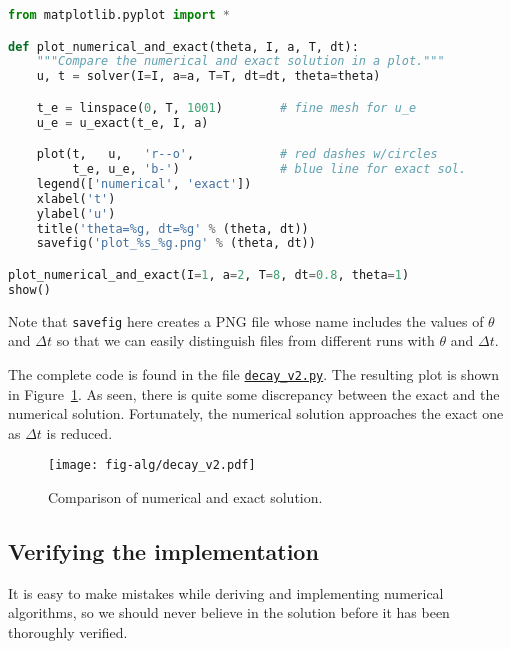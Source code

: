 \documentclass[graybox,sectrefs,envcountresetchap,open=right,final]{svmonodo}
\begin{document}
\begin{lstlisting}[language=python,style=blue1_bluegreen]
from matplotlib.pyplot import *

def plot_numerical_and_exact(theta, I, a, T, dt):
    """Compare the numerical and exact solution in a plot."""
    u, t = solver(I=I, a=a, T=T, dt=dt, theta=theta)

    t_e = linspace(0, T, 1001)        # fine mesh for u_e
    u_e = u_exact(t_e, I, a)

    plot(t,   u,   'r--o',            # red dashes w/circles
         t_e, u_e, 'b-')              # blue line for exact sol.
    legend(['numerical', 'exact'])
    xlabel('t')
    ylabel('u')
    title('theta=%g, dt=%g' % (theta, dt))
    savefig('plot_%s_%g.png' % (theta, dt))

plot_numerical_and_exact(I=1, a=2, T=8, dt=0.8, theta=1)
show()

\end{lstlisting}

Note that \texttt{savefig} here creates a PNG file whose name includes the
values of $\theta$ and $\Delta t$ so that we can easily distinguish
files from different runs with $\theta$ and $\Delta t$.

The complete code is found in the file
\href{{http://tinyurl.com/ofkw6kc/alg/decay_v2.py}}{\nolinkurl{decay_v2.py}}. The resulting plot
is shown in Figure~\ref{decay:fig:v2}. As seen, there is quite some
discrepancy between the exact and the numerical solution.
Fortunately, the numerical solution approaches the exact one as
$\Delta t$ is reduced.

\begin{figure}[!ht]  %
  \centerline{\texttt{[image: fig-alg/decay\_v2.pdf]}}
  \caption{
  Comparison of numerical and exact solution. \label{decay:fig:v2}
  }
\end{figure}

\subsection{Verifying the implementation}

It is easy to make mistakes while deriving and implementing numerical
algorithms, so we should never believe in the solution before it has
been thoroughly verified.
\end{document}
